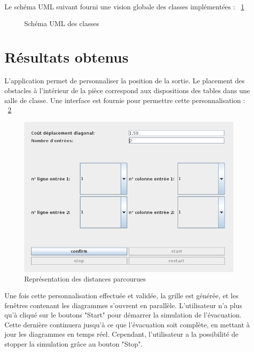 \documentclass[twoside,UTF8]{EPURapport}
\begin{document}
	Le schéma UML suivant fourni une vision globale des classes implémentées : ~\ref{fig:uml}\\
	
%	
	
	\begin{figure}[!H]
	\centering
	
	\caption{Schéma UML des classes}
	\label{fig:uml}
	\end{figure}
	
	\section{Résultats obtenus}
	L'application permet de personnaliser la position de la sortie. Le placement des obstacles à l'intérieur de la pièce correspond aux dispositions des tables dans une salle de classe. Une interface est fournie pour permettre cette personnalisation : ~\ref{fig:distances_parcourues}
		
	\begin{figure}[!H]
	\centering
	\includegraphics[scale=0.7]{imagesPNG/personnalisation.png}
	\caption{Représentation des distances parcourues}
	\label{fig:distances_parcourues}
	\end{figure}
		
	Une fois cette personnalisation effectuée et validée, la grille est générée, et les fenêtres contenant les diagrammes s'ouvrent en parallèle. L'utilisateur n'a plus qu'à cliqué sur le boutons "Start" pour démarrer la simulation de l'évacuation. Cette dernière continuera jusqu'à ce que l'évacuation soit complète, en mettant à jour les diagrammes en temps réel. Cependant, l'utilisateur a la possibilité de stopper la simulation grâce au bouton "Stop".
		
\end{document}
